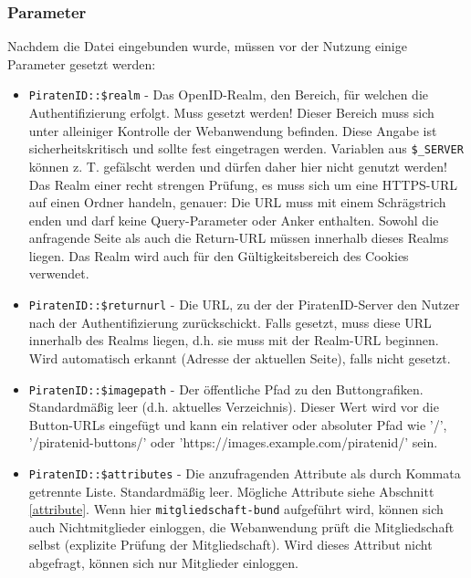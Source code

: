 \subsubsection{Parameter}
Nachdem die Datei eingebunden wurde, müssen vor der Nutzung einige Parameter gesetzt werden:
\begin{itemize}
	\item \texttt{PiratenID::\$realm} - Das OpenID-Realm, den Bereich, für welchen die Authentifizierung erfolgt. Muss gesetzt werden!
										Dieser Bereich muss sich unter alleiniger Kontrolle der Webanwendung befinden.
										Diese Angabe ist sicherheitskritisch und sollte fest eingetragen werden.
										Variablen aus \texttt{\$\_SERVER} können z. T. gefälscht werden und dürfen daher hier nicht genutzt werden!
										Das Realm einer recht strengen Prüfung, es muss sich um eine HTTPS-URL auf einen Ordner handeln, genauer:
										Die URL muss mit einem Schrägstrich enden und darf keine Query-Parameter oder Anker enthalten.
										Sowohl die anfragende Seite als auch die Return-URL müssen innerhalb dieses Realms liegen.
										Das Realm wird auch für den Gültigkeitsbereich des Cookies verwendet.
										
	\item \texttt{PiratenID::\$returnurl} - Die URL, zu der der PiratenID-Server den Nutzer nach der Authentifizierung zurückschickt.
											Falls gesetzt, muss diese URL innerhalb des Realms liegen, d.h. sie muss mit der Realm-URL beginnen.
											Wird automatisch erkannt (Adresse der aktuellen Seite), falls nicht gesetzt.

	\item \texttt{PiratenID::\$imagepath} - Der öffentliche Pfad zu den Buttongrafiken. Standardmäßig leer (d.h. aktuelles Verzeichnis).
											Dieser Wert wird vor die Button-URLs eingefügt und kann ein relativer oder absoluter Pfad wie '/',
											'/piratenid-buttons/' oder 'https://images.example.com/piratenid/' sein.

	\item \texttt{PiratenID::\$attributes} - Die anzufragenden Attribute als durch Kommata getrennte Liste. Standardmäßig leer.
											Mögliche Attribute siehe Abschnitt \ref{attribute}.
											Wenn hier  \texttt{mitgliedschaft-bund} aufgeführt wird, können sich auch Nichtmitglieder einloggen,
											die Webanwendung prüft die Mitgliedschaft selbst (explizite Prüfung der Mitgliedschaft).
											Wird dieses Attribut nicht abgefragt, können sich nur Mitglieder einloggen.


\end{itemize}
